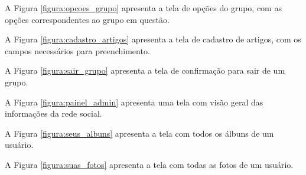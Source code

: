 A Figura \ref{figura:opcoes_grupo} apresenta a tela de opções do grupo, com as opções correspondentes ao grupo em questão.


A Figura \ref{figura:cadastro_artigos} apresenta a tela de cadastro de artigos, com os campos necessários para preenchimento.


A Figura \ref{figura:sair_grupo} apresenta a tela de confirmação para sair de um grupo.


A Figura \ref{figura:painel_admin} apresenta uma tela com visão geral das informações da rede social.


A Figura \ref{figura:seus_albuns} apresenta a tela com todos os álbuns de um usuário.


A Figura \ref{figura:suas_fotos} apresenta a tela com todas as fotos de um usuário.


